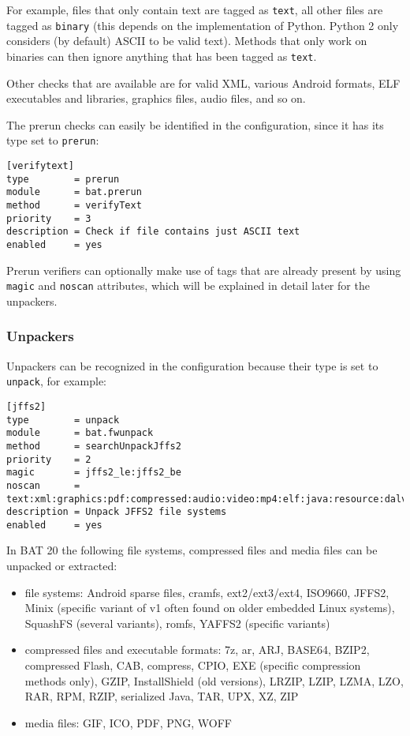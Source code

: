 \documentclass[10pt]{article}
\begin{document}
For example, files that only contain text are tagged as \texttt{text}, all other
files are tagged as \texttt{binary} (this depends on the implementation of
Python. Python 2 only considers (by default) ASCII to be valid text). Methods
that only work on binaries can then ignore anything that has been tagged as
\texttt{text}.

Other checks that are available are for valid XML, various Android formats,
ELF executables and libraries, graphics files, audio files, and so on.

The prerun checks can easily be identified in the configuration, since it has
its type set to \texttt{prerun}:

\begin{verbatim}
[verifytext]
type        = prerun
module      = bat.prerun
method      = verifyText
priority    = 3
description = Check if file contains just ASCII text
enabled     = yes
\end{verbatim}

Prerun verifiers can optionally make use of tags that are already present by
using \texttt{magic} and \texttt{noscan} attributes, which will be explained
in detail later for the unpackers.

\subsubsection{Unpackers}

Unpackers can be recognized in the configuration because their type is set
to \texttt{unpack}, for example:

\begin{verbatim}
[jffs2]
type        = unpack
module      = bat.fwunpack
method      = searchUnpackJffs2
priority    = 2
magic       = jffs2_le:jffs2_be
noscan      = text:xml:graphics:pdf:compressed:audio:video:mp4:elf:java:resource:dalvik
description = Unpack JFFS2 file systems
enabled     = yes
\end{verbatim}

In BAT 20 the following file systems, compressed files and media files can be
unpacked or extracted:

\begin{itemize}
\item file systems: Android sparse files, cramfs, ext2/ext3/ext4, ISO9660,
JFFS2, Minix (specific variant of v1 often found on older embedded Linux
systems), SquashFS (several variants), romfs, YAFFS2 (specific variants)
\item compressed files and executable formats: 7z, ar, ARJ, BASE64, BZIP2,
compressed Flash, CAB, compress, CPIO, EXE (specific compression methods only),
GZIP, InstallShield (old versions), LRZIP, LZIP, LZMA, LZO, RAR, RPM, RZIP,
serialized Java, TAR, UPX, XZ, ZIP
\item media files: GIF, ICO, PDF, PNG, WOFF
\end{itemize}
\end{document}
